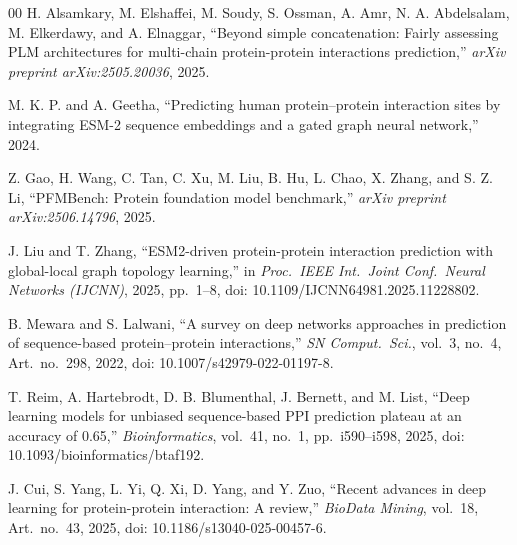 \documentclass[conference]{IEEEtran}
\begin{document}
\begin{thebibliography}{00}
H. Alsamkary, M. Elshaffei, M. Soudy, S. Ossman, A. Amr, N. A. Abdelsalam,
M. Elkerdawy, and A. Elnaggar,
``Beyond simple concatenation: Fairly assessing {PLM} architectures for
multi-chain protein-protein interactions prediction,''
\textit{arXiv preprint arXiv:2505.20036}, 2025.

M. K. P. and A. Geetha,
``Predicting human protein--protein interaction sites by integrating {ESM-2}
sequence embeddings and a gated graph neural network,'' 2024.

Z. Gao, H. Wang, C. Tan, C. Xu, M. Liu, B. Hu, L. Chao, X. Zhang, and
S. Z. Li,
``{PFMBench}: Protein foundation model benchmark,''
\textit{arXiv preprint arXiv:2506.14796}, 2025.

J. Liu and T. Zhang,
``{ESM2}-driven protein-protein interaction prediction with global-local graph
topology learning,''
in \textit{Proc.\ IEEE Int.\ Joint Conf.\ Neural Networks (IJCNN)}, 2025,
pp.~1--8, doi: 10.1109/IJCNN64981.2025.11228802.

B. Mewara and S. Lalwani,
``A survey on deep networks approaches in prediction of sequence-based
protein--protein interactions,''
\textit{SN Comput.\ Sci.}, vol.~3, no.~4, Art.~no.~298, 2022,
doi: 10.1007/s42979-022-01197-8.

T. Reim, A. Hartebrodt, D. B. Blumenthal, J. Bernett, and M. List,
``Deep learning models for unbiased sequence-based {PPI} prediction plateau at
an accuracy of 0.65,''
\textit{Bioinformatics}, vol.~41, no.~1, pp.~i590--i598, 2025,
doi: 10.1093/bioinformatics/btaf192.

J. Cui, S. Yang, L. Yi, Q. Xi, D. Yang, and Y. Zuo,
``Recent advances in deep learning for protein-protein interaction: A
review,''
\textit{BioData Mining}, vol.~18, Art.~no.~43, 2025,
doi: 10.1186/s13040-025-00457-6.

\end{thebibliography}
\end{document}
